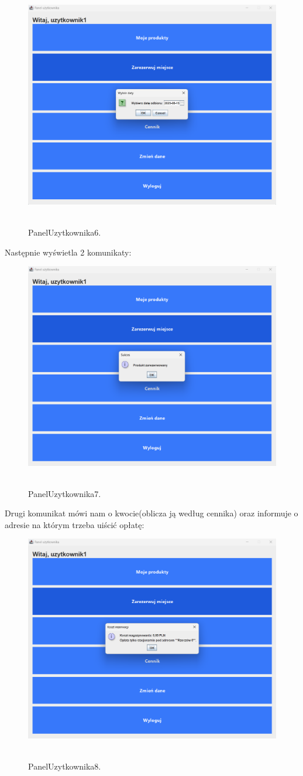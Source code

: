 \begin{figure}[H]
    \centering
    \includegraphics[width=.7\linewidth]{figures/PanelUzytkownika6.png}\
    \caption{PanelUzytkownika6.\label{PanelUzytkownika6}}
\end{figure}
Następnie wyświetla 2 komunikaty:
\begin{figure}[H]
    \centering
    \includegraphics[width=.7\linewidth]{figures/PanelUzytkownika7.png}\
    \caption{PanelUzytkownika7.\label{PanelUzytkownika7}}
\end{figure}
Drugi komunikat mówi nam o kwocie(oblicza ją według cennika) oraz informuje o adresie na którym trzeba uiścić opłatę:
\begin{figure}[H]
    \centering
    \includegraphics[width=.7\linewidth]{figures/PanelUzytkownika8.png}\
    \caption{PanelUzytkownika8.\label{PanelUzytkownika8}}
\end{figure}
\clearpage
